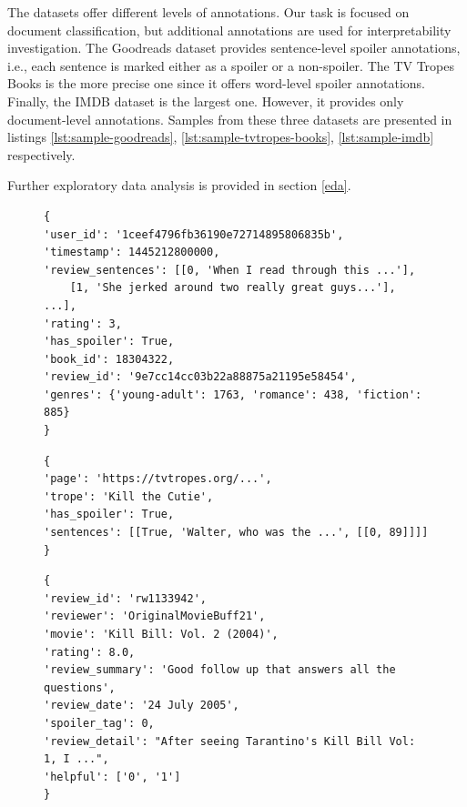 \documentclass[11pt]{article}
\begin{document}
The datasets offer different levels of annotations. Our task is focused on document classification, but additional annotations are used for interpretability investigation.
The Goodreads dataset provides sentence-level spoiler annotations, i.e., each sentence is marked either as a spoiler or a non-spoiler. The TV Tropes Books is the more precise one since it offers word-level spoiler annotations. Finally, the IMDB dataset is the largest one. However, it provides only document-level annotations. Samples from these three datasets are presented in listings \ref{lst:sample-goodreads}, \ref{lst:sample-tvtropes-books}, \ref{lst:sample-imdb} respectively.

Further exploratory data analysis is provided in section \ref{eda}.

\begin{figure}[h]
\begin{lstlisting}[basicstyle=\small,caption={Sample JSON object in the Goodreads dataset. Each sentence contains an integer flag that identifies spoiler sentences. Note that some entries were truncated due to readability reasons.},label={lst:sample-goodreads}]
{
'user_id': '1ceef4796fb36190e72714895806835b',
'timestamp': 1445212800000,
'review_sentences': [[0, 'When I read through this ...'],
    [1, 'She jerked around two really great guys...'], ...],
'rating': 3,
'has_spoiler': True,
'book_id': 18304322,
'review_id': '9e7cc14cc03b22a88875a21195e58454',
'genres': {'young-adult': 1763, 'romance': 438, 'fiction': 885}
}
\end{lstlisting}

\begin{lstlisting}[basicstyle=\small,caption={Sample JSON object in the TV Tropes Books dataset. Each sentence contains a boolean flag that identifies spoiler sentences. In addition, annotated character indices provide specific spoiler boundaries.},label={lst:sample-tvtropes-books}]
{
'page': 'https://tvtropes.org/...',
'trope': 'Kill the Cutie',
'has_spoiler': True,
'sentences': [[True, 'Walter, who was the ...', [[0, 89]]]]
}
\end{lstlisting}

\begin{lstlisting}[basicstyle=\small,caption={Sample JSON object in the IMDB dataset. The dataset features only document-level annotations},label={lst:sample-imdb}]
{
'review_id': 'rw1133942',
'reviewer': 'OriginalMovieBuff21',
'movie': 'Kill Bill: Vol. 2 (2004)',
'rating': 8.0,
'review_summary': 'Good follow up that answers all the questions',
'review_date': '24 July 2005',
'spoiler_tag': 0,
'review_detail': "After seeing Tarantino's Kill Bill Vol: 1, I ...",
'helpful': ['0', '1']
}
\end{lstlisting}

\end{figure}
\end{document}

